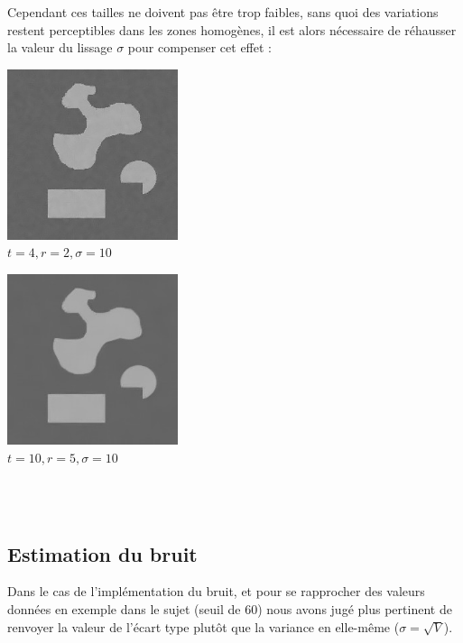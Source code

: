 \documentclass[a4,12pt]{article}
\begin{document}
Cependant ces tailles ne doivent pas être trop faibles, sans quoi des variations restent perceptibles dans les zones homogènes, il est alors nécessaire de réhausser la valeur du lissage $\sigma$ pour compenser cet effet :\\

\noindent
\begin{minipage}[c]{0.50\linewidth}
	\begin{center}
		\includegraphics[width = 50mm]{./img/nltroppetit4-2-10.jpg}\\
		\textit{$t=4, r=2, \sigma=10$}\\
	\end{center}
\end{minipage}
\begin{minipage}[c]{0.50\linewidth}
	\begin{center}
		\includegraphics[width = 50mm]{./img/nlassezgrand10-5-10.jpg}\\
		\textit{$t=10, r=5, \sigma=10$}\\
	\end{center}
\end{minipage}\\
\\
\subsection{Estimation du bruit}
Dans le cas de l'implémentation du bruit, et pour se rapprocher des valeurs données en exemple dans le sujet (seuil de 60) nous avons jugé plus pertinent de renvoyer la valeur de l'écart type plutôt que la variance en elle-même ($\sigma = \sqrt{V}$).
\end{document}

